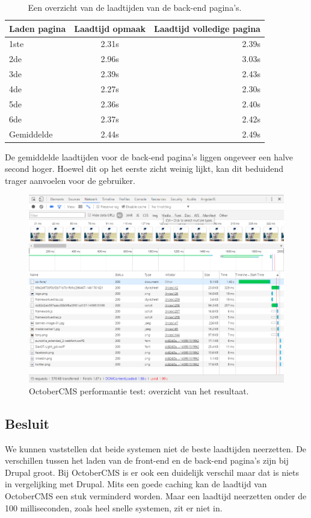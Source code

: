 \begin{table}[!ht]
\centering
\begin{tabular}{|l|c|r|}
    \hline
    Laden pagina & Laadtijd opmaak & Laadtijd volledige pagina\\
    \hline
    1ste & 2.31s & 2.39s\\
    \hline
    2de & 2.96s & 3.03s\\
    \hline
    3de & 2.39s & 2.43s\\
    \hline
    4de & 2.27s & 2.30s\\
    \hline
    5de & 2.36s & 2.40s\\
     \hline
    6de & 2.37s & 2.42s\\
    \hline
    Gemiddelde & 2.44s & 2.49s\\
    \hline
\end{tabular}
\caption{\label{tab:OctoberCMS resultaten performantie back-end } Een overzicht van de laadtijden van de back-end pagina's.}
\end{table}

\noindent
De gemiddelde laadtijden voor de back-end pagina's liggen ongeveer een halve second hoger. Hoewel dit op het eerste zicht weinig lijkt, kan dit beduidend trager aanvoelen voor de gebruiker.

\begin{figure}[!ht]
  \includegraphics[width=\textwidth]{img/oc-performance-test.png}
  \caption{OctoberCMS performantie test: overzicht van het resultaat.}
  \label{fig:OctoberCMS performantie test.}
\end{figure}


\subsection{Besluit}
We kunnen vaststellen dat beide systemen niet de beste laadtijden neerzetten. De verschillen tussen het laden van de front-end en de back-end pagina's zijn bij Drupal groot. Bij OctoberCMS is er ook een duidelijk verschil maar dat is niets in vergelijking met Drupal.
\newline\newline
Mits een goede caching kan de laadtijd van OctoberCMS een stuk verminderd worden. Maar een laadtijd neerzetten onder de 100 milliseconden, zoals heel snelle systemen, zit er niet in.


